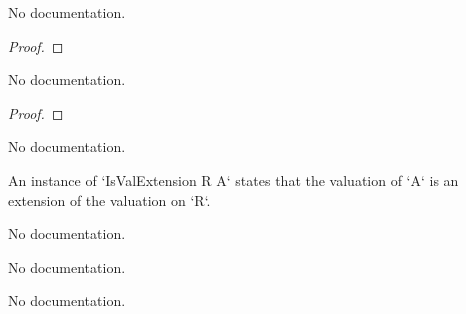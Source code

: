 \begin{theorem}\label{IsValExtension.val_map_le_one_iff}
        \leanok
                No documentation.
    \end{theorem}

\begin{proof}
    \leanok
\end{proof}

\begin{theorem}\label{IsValExtension.val_map_lt_one_iff}
        \leanok
                No documentation.
    \end{theorem}

\begin{proof}
    \leanok
\end{proof}

\begin{theorem}\label{IsValExtension.val_map_eq_one_iff}
                No documentation.
    \end{theorem}

\begin{definition}\label{IsValExtension}
        \leanok
                An instance of `IsValExtension R A` states that the valuation of `A` is an extension of the valuation on `R`.
    \end{definition}

\begin{definition}\label{IsValExtension.of_integer_comap}
        \leanok
                No documentation.
    \end{definition}

\begin{definition}\label{IsValExtension.of_valuationSubring_comap}
                No documentation.
    \end{definition}

\begin{theorem}\label{IsValExtension.coe_algebraMap_integer}
        \leanok
                No documentation.
    \end{theorem}

